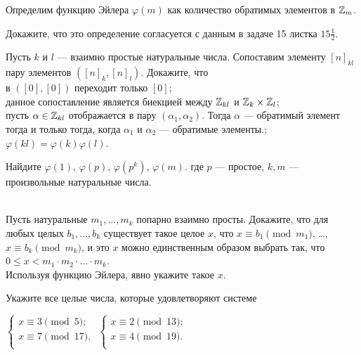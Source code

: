 \documentclass[a4paper, 12pt]{article}
\begin{document}
Определим функцию Эйлера $\varphi(m)$ как количество обратимых элементов в $\mathbb{Z}_m$.

Докажите, что это определение согласуется с данным в задаче 15 листка $15\frac12$.

 
 Пусть $k$ и $l$ --- взаимно простые натуральные числа. Сопоставим элементу $[n]_{kl}$ пару элементов $([n]_k,[n]_l)$. Докажите, что
\\
 в $([0],[0])$ переходит только $[0]$;\\
 данное сопоставление является биекцией между $\mathbb{Z}_{kl}$ и $\mathbb{Z}_k\times\mathbb{Z}_l$;\\
 пусть $\alpha \in \mathbb{Z}_{kl}$ отображается в пару $(\alpha_1,\alpha_2)$. Тогда $\alpha$ --- обратимый элемент тогда и только тогда, когда $\alpha_1$ и $\alpha_2$ --- обратимые элементы.;\\
 $\varphi(kl) = \varphi(k)\varphi(l)$.

 Найдите  $\varphi(1)$,  $\varphi(p)$,  $\varphi(p^k)$,  $\varphi(m)$. где $p$ --- простое, $k,m$ --- произвольные натуральные числа.

\\
 Пусть натуральные $m_1, \dots, m_k$ попарно взаимно просты.
Докажите, что для любых целых $b_1,\dots,b_k$ существует такое
целое $x$, что
$x\equiv b_1\!\pmod{m_1}$, \dots,
$x\equiv b_k\!\pmod{m_k}$,
и это $x$ можно единственным образом выбрать так, что
$0\leq x< m_1\cdot m_2\cdot\ldots\cdot m_k$.\\
 Используя функцию Эйлера, явно укажите такое $x$.

 Укажите все целые числа, которые удовлетворяют системе

{ $  \left\{
\begin{array}{l}
x \equiv 3 \pmod{5};  \\[4pt]
x \equiv 7 \pmod{17}.  \\[4pt]
\end{array}
\right. $}
{ $  \left\{
\begin{array}{l}
x \equiv 2 \pmod{13};  \\[4pt]
x \equiv 4 \pmod{19}.  \\[4pt]
\end{array}
\right. $}
\end{document}
